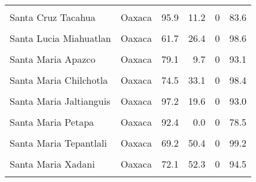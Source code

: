 \documentclass[
]{report}
\begin{document}
\begin{longtable}[t]{llrrrr}
\cellcolor{gray!6}{Santa Cruz Acatepec} & \cellcolor{gray!6}{Oaxaca} & \cellcolor{gray!6}{73.3} & \cellcolor{gray!6}{40.7} & \cellcolor{gray!6}{0} & \cellcolor{gray!6}{98.5}\\
Santa Cruz Tacahua & Oaxaca & 95.9 & 11.2 & 0 & 83.6\\
\cellcolor{gray!6}{Santa Cruz Zenzontepec} & \cellcolor{gray!6}{Oaxaca} & \cellcolor{gray!6}{71.2} & \cellcolor{gray!6}{11.7} & \cellcolor{gray!6}{0} & \cellcolor{gray!6}{95.8}\\
Santa Lucia Miahuatlan & Oaxaca & 61.7 & 26.4 & 0 & 98.6\\
\addlinespace
\cellcolor{gray!6}{Santa Lucia Monteverde} & \cellcolor{gray!6}{Oaxaca} & \cellcolor{gray!6}{88.9} & \cellcolor{gray!6}{15.4} & \cellcolor{gray!6}{0} & \cellcolor{gray!6}{97.6}\\
Santa Maria Apazco & Oaxaca & 79.1 & 9.7 & 0 & 93.1\\
\cellcolor{gray!6}{Santa Maria La Asuncion} & \cellcolor{gray!6}{Oaxaca} & \cellcolor{gray!6}{49.8} & \cellcolor{gray!6}{36.6} & \cellcolor{gray!6}{0} & \cellcolor{gray!6}{99.2}\\
Santa Maria Chilchotla & Oaxaca & 74.5 & 33.1 & 0 & 98.4\\
\cellcolor{gray!6}{Santa Maria Chimalapa} & \cellcolor{gray!6}{Oaxaca} & \cellcolor{gray!6}{81.1} & \cellcolor{gray!6}{0.0} & \cellcolor{gray!6}{0} & \cellcolor{gray!6}{87.6}\\
\addlinespace
Santa Maria Jaltianguis & Oaxaca & 97.2 & 19.6 & 0 & 93.0\\
\cellcolor{gray!6}{Santa Maria Penoles} & \cellcolor{gray!6}{Oaxaca} & \cellcolor{gray!6}{83.6} & \cellcolor{gray!6}{15.1} & \cellcolor{gray!6}{0} & \cellcolor{gray!6}{97.9}\\
Santa Maria Petapa & Oaxaca & 92.4 & 0.0 & 0 & 78.5\\
\cellcolor{gray!6}{Santa Maria Temaxcaltepec} & \cellcolor{gray!6}{Oaxaca} & \cellcolor{gray!6}{67.8} & \cellcolor{gray!6}{36.6} & \cellcolor{gray!6}{0} & \cellcolor{gray!6}{96.9}\\
Santa Maria Tepantlali & Oaxaca & 69.2 & 50.4 & 0 & 99.2\\
\addlinespace
\cellcolor{gray!6}{Santa Maria Tlalixtac} & \cellcolor{gray!6}{Oaxaca} & \cellcolor{gray!6}{77.7} & \cellcolor{gray!6}{12.3} & \cellcolor{gray!6}{0} & \cellcolor{gray!6}{74.2}\\
Santa Maria Xadani & Oaxaca & 72.1 & 52.3 & 0 & 94.5\\
\cellcolor{gray!6}{Santa Maria Yolotepec} & \cellcolor{gray!6}{Oaxaca} & \cellcolor{gray!6}{99.0} & \cellcolor{gray!6}{24.4} & \cellcolor{gray!6}{0} & \cellcolor{gray!6}{99.0}\\

\end{longtable}
\end{document}
